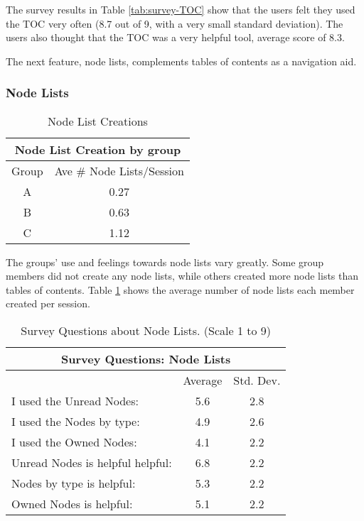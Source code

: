 The survey results in Table \ref{tab:survey-TOC} show that the users felt
they used the TOC very often (8.7 out of 9, with a very small standard
deviation).  The users also thought that the TOC was a very helpful tool,
average score of 8.3.  

The next feature, node lists, complements tables of contents as a navigation
aid.

\subsubsection{Node Lists}
\small
\begin{table}[htb]
  \caption{Node List Creations}
  \begin{center}
    \begin{tabular}{|c|c|}
      \hline
      \multicolumn{2}{|c|}{\rule[-3mm]{0mm}{8mm}\bf Node List Creation by group}\\ 
      \hline
      Group&Ave \# Node Lists/Session\\ \hline
      \hline
      A&0.27\\ \hline
      B&0.63\\ \hline
      C&1.12\\ \hline
    \end{tabular}
  \end{center}
  \label{tab:NL}
\end{table}
\normalsize

The groups' use and feelings towards node lists vary greatly.  Some group
members did not create any node lists, while others created more node lists
than tables of contents.  Table \ref{tab:NL} shows the average number of
node lists each member created per session.


\small
\begin{table}[htbp]
  \caption{Survey Questions about Node Lists. (Scale 1 to 9)}
  \begin{center}
    \begin{tabular}{|l|c|c|}
      \hline
      \multicolumn{3}{|c|}{\rule[-3mm]{0mm}{8mm}\bf Survey Questions:
      Node Lists}\\ \hline
      &Average&Std. Dev.\\ \hline
      I used the Unread Nodes:&5.6&2.8\\\hline
      I used the Nodes by type:&4.9&2.6\\\hline
      I used the Owned Nodes:&4.1&2.2\\\hline
      Unread Nodes is helpful helpful:&6.8&2.2\\\hline
      Nodes by type is helpful:&5.3&2.2\\\hline
      Owned Nodes is helpful:&5.1&2.2\\\hline
    \end{tabular}
  \end{center}
  \label{tab:survey-Nodelist}
\end{table}
\normalsize


